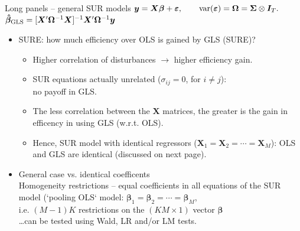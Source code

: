 \documentclass[usenames,dvipsnames]{beamer}
\begin{document}
\begin{frame}{Long panels -- general SUR models}
\footnotesize
$\bm{y} = \bm{X} \bm{\beta} + \bm{\varepsilon}, \qquad \textnormal{var}(\bm{\varepsilon}) = \bm{\Omega} = \bm{\Sigma} \otimes \bm{I}_T.$ \\ \medskip
$\bm{\hat{\beta}}_{\textnormal{GLS}} = [\bm{X}^{\prime} \bm{\Omega}^{-1} \bm{X}]^{-1} \bm{X}^{\prime} \bm{\Omega}^{-1} \bm{y}$\\ \bigskip
    \begin{itemize}
    \item SURE: how much efficiency over OLS is gained by GLS (SURE)?
    \begin{itemize}
        \item Higher correlation of disturbances $\rightarrow$ higher efficiency gain.
         \smallskip
        \item SUR equations actually unrelated ($\sigma_{ij} = 0$, for $i\neq j$): \\no payoff in GLS.
        \smallskip
        \item The less correlation between the $\bm{X}$ matrices, the greater is the gain in efficency in using GLS (w.r.t. OLS). 
         \smallskip
        \item Hence, SUR model with identical regressors ($\bm{X}_1=\bm{X}_2=\cdots=\bm{X}_M$): OLS and GLS are identical (discussed on next page).
    \end{itemize}
    \bigskip
    \item General case vs. identical coefficents\\ Homogeneity restrictions -- equal coefficients in all equations of the SUR model (`pooling OLS` model: $\bm{\beta}_1=\bm{\beta}_2=\cdots=\bm{\beta}_M$, \\ \smallskip i.e. $(M-1)K$ restrictions on the $(KM\times 1)$ vector $\bm{\beta}$ \\ \dots can be tested using Wald, LR and/or LM tests.
\end{itemize}
\end{frame}
\end{document}

